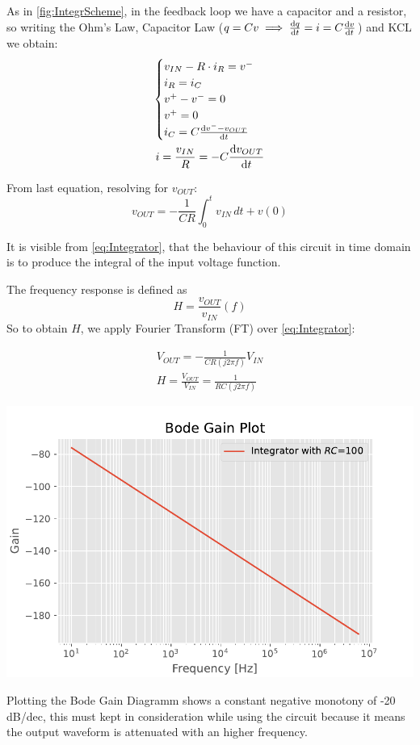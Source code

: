 \documentclass[a4paper,twocolumn]{article}
\begin{document}
As in \ref{fig:IntegrScheme}, in the feedback loop we have a capacitor and a resistor, so writing the Ohm's Law, Capacitor Law ($ q = Cv \implies \dv {q}{t}=i=C\dv{v}{t} $) and KCL we obtain:
\begin{gather*}
    \begin{cases}
        v_{IN} - R\cdot i_R = v^-\\
        i_R=i_C\\
        v^+-v^-=0\\
        v^+=0\\
        i_C=C\dv{v^--v_{OUT}}{t}
    \end{cases}\\
    i = \frac{v_{IN}}{R}=-C\dv{v_{OUT}}{t}\\
\end{gather*}

From last equation, resolving for $v_{OUT}$:
\begin{equation}
\label{eq:Integrator}
    v_{OUT}=-\frac{1}{CR}\int_0^t{v_{IN}}\,dt + v(0)
\end{equation}

It is visible from \eqref{eq:Integrator}, that the behaviour of this circuit in time domain is to produce the integral of the input voltage function.

The frequency response is defined as \[H=\frac{v_{OUT}}{v_{IN}}(f)\]
So to obtain $H$, we apply Fourier Transform (FT) over \eqref{eq:Integrator}:

\begin{gather}
    V_{OUT}=-\frac{1}{CR(j2\pi f)}V_{IN}\\
    H = \frac{V_{OUT}}{V_{IN}} = \frac{1}{RC(j2\pi f)}   
\end{gather}

\begin{center}
    \includegraphics[width=\columnwidth]{graph/IntegratorBodeTheo}
    \label{fig:IntBodeGraphTheo}
\end{center}
Plotting the Bode Gain Diagramm shows a constant negative monotony of -20 dB/dec, this must kept in consideration while using the circuit because it means the output waveform is attenuated with an higher frequency.
\end{document}
